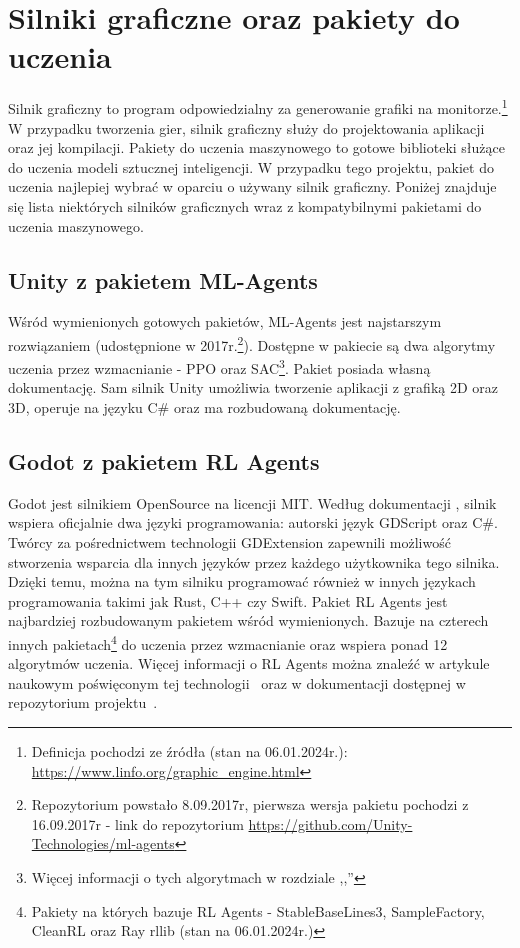 \documentclass{SGGW-thesis}
\begin{document}
\section{Silniki graficzne oraz pakiety do uczenia}
Silnik graficzny to program odpowiedzialny za generowanie grafiki na monitorze.\footnote{Definicja pochodzi ze źródła (stan na 06.01.2024r.): \url{https://www.linfo.org/graphic_engine.html}} W przypadku tworzenia gier, silnik graficzny służy do projektowania aplikacji oraz jej kompilacji. Pakiety do uczenia maszynowego to gotowe biblioteki służące do uczenia modeli sztucznej inteligencji. 
W przypadku tego projektu, pakiet do uczenia najlepiej wybrać w oparciu o używany silnik graficzny. Poniżej znajduje się lista niektórych silników graficznych wraz z kompatybilnymi pakietami do uczenia maszynowego.
\subsection{Unity z pakietem ML-Agents}
Wśród wymienionych gotowych pakietów, ML-Agents jest najstarszym rozwiązaniem (udostępnione w 2017r.\footnote{Repozytorium powstało 8.09.2017r, pierwsza wersja pakietu pochodzi z 16.09.2017r - link do repozytorium \url{https://github.com/Unity-Technologies/ml-agents}}).
Dostępne w pakiecie są dwa algorytmy uczenia przez wzmacnianie - PPO oraz SAC\footnote{Więcej informacji o tych algorytmach w rozdziale ,,''}. Pakiet posiada własną dokumentację\cite{MLAgentsDocs}. 
Sam silnik Unity umożliwia tworzenie aplikacji z grafiką 2D oraz 3D, operuje na języku C\# oraz ma rozbudowaną dokumentację\cite{UnityDocs}.
\subsection{Godot z pakietem RL Agents}
Godot jest silnikiem OpenSource na licencji MIT. Według dokumentacji \cite{GodotDocs}, silnik wspiera oficjalnie dwa języki programowania: autorski język GDScript oraz C\#. Twórcy za pośrednictwem technologii GDExtension zapewnili możliwość stworzenia wsparcia dla innych języków przez każdego użytkownika tego silnika.
Dzięki temu, można na tym silniku programować również w innych językach programowania takimi jak Rust, C++ czy Swift. Pakiet RL Agents jest najbardziej rozbudowanym pakietem wśród wymienionych.
Bazuje na czterech innych pakietach\footnote{Pakiety na których bazuje RL Agents - StableBaseLines3, SampleFactory, CleanRL oraz Ray rllib (stan na 06.01.2024r.)} do uczenia przez wzmacnianie
oraz wspiera ponad 12 algorytmów uczenia. Więcej informacji o RL Agents można znaleźć w artykule naukowym poświęconym tej technologii~\cite{GodotRLAgentsArticle} oraz w dokumentacji dostępnej w repozytorium projektu~\cite{GodotRLAgentsDocs}.
\end{document}
